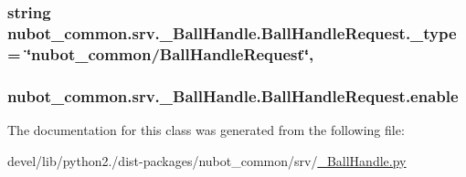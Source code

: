 \hypertarget{classnubot__common_1_1srv_1_1__BallHandle_1_1BallHandleRequest_a63be4374211860a9279e710e8a4ca729}{
\subsubsection[{\-\_\-type}]{\setlength{\rightskip}{0pt plus 5cm}string nubot\-\_\-common.\-srv.\-\_\-\-Ball\-Handle.\-Ball\-Handle\-Request.\-\_\-type = \char`\"{}nubot\-\_\-common/{\bf Ball\-Handle\-Request}\char`\"{}\hspace{0.3cm}{\ttfamily [static]}, {\ttfamily [private]}}}\label{classnubot__common_1_1srv_1_1__BallHandle_1_1BallHandleRequest_a63be4374211860a9279e710e8a4ca729}
\hypertarget{classnubot__common_1_1srv_1_1__BallHandle_1_1BallHandleRequest_abfcbfca110adbedb7639ae12940532db}{
\subsubsection[{enable}]{\setlength{\rightskip}{0pt plus 5cm}nubot\-\_\-common.\-srv.\-\_\-\-Ball\-Handle.\-Ball\-Handle\-Request.\-enable}}\label{classnubot__common_1_1srv_1_1__BallHandle_1_1BallHandleRequest_abfcbfca110adbedb7639ae12940532db}


The documentation for this class was generated from the following file\-:\begin{DoxyCompactItemize}
\item 
devel/lib/python2./dist-\/packages/nubot\-\_\-common/srv/\hyperlink{__BallHandle_8py}{\-\_\-\-Ball\-Handle.\-py}\end{DoxyCompactItemize}
